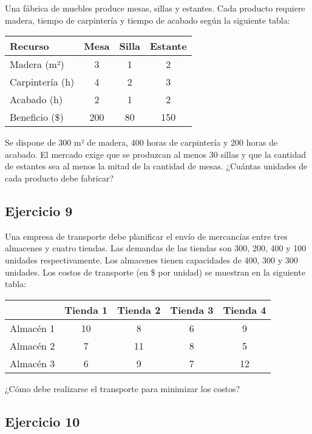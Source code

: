\documentclass[12pt]{article}
\begin{document}
Una fábrica de muebles produce mesas, sillas y estantes. Cada producto requiere madera, tiempo de carpintería y tiempo de acabado según la siguiente tabla:

\begin{center}
\begin{tabular}{lccc}
\toprule
Recurso & Mesa & Silla & Estante \\
\midrule
Madera (m²) & 3 & 1 & 2 \\
Carpintería (h) & 4 & 2 & 3 \\
Acabado (h) & 2 & 1 & 2 \\
\midrule
Beneficio (\$) & 200 & 80 & 150 \\
\bottomrule
\end{tabular}
\end{center}

Se dispone de 300 m² de madera, 400 horas de carpintería y 200 horas de acabado. El mercado exige que se produzcan al menos 30 sillas y que la cantidad de estantes sea al menos la mitad de la cantidad de mesas. ¿Cuántas unidades de cada producto debe fabricar?

\subsection*{Ejercicio 9}

Una empresa de transporte debe planificar el envío de mercancías entre tres almacenes y cuatro tiendas. Las demandas de las tiendas son 300, 200, 400 y 100 unidades respectivamente. Los almacenes tienen capacidades de 400, 300 y 300 unidades. Los costos de transporte (en \$ por unidad) se muestran en la siguiente tabla:

\begin{center}
\begin{tabular}{lcccc}
\toprule
& Tienda 1 & Tienda 2 & Tienda 3 & Tienda 4 \\
\midrule
Almacén 1 & 10 & 8 & 6 & 9 \\
Almacén 2 & 7 & 11 & 8 & 5 \\
Almacén 3 & 6 & 9 & 7 & 12 \\
\bottomrule
\end{tabular}
\end{center}

¿Cómo debe realizarse el transporte para minimizar los costos?

\subsection*{Ejercicio 10}
\end{document}
